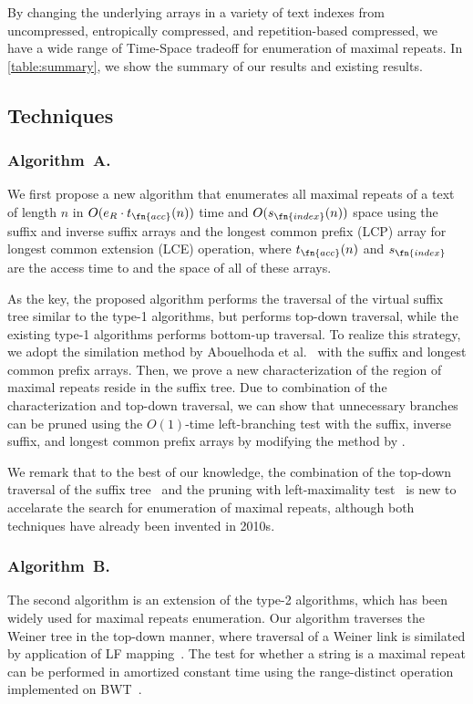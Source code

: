 By changing the underlying arrays in a variety of text indexes from uncompressed, entropically compressed, and repetition-based compressed, we have a wide range of Time-Space tradeoff for enumeration of maximal repeats. 
In \cref{table:summary}, we show the summary of our results and existing results. 

\subsection{Techniques}
\subsubsection{Algorithm~A.}
We first propose a new algorithm that enumerates all maximal repeats of a text of length $n$ in $O(e_R\cdot t_\fn{acc}(n))$ time and $O(s_\fn{index}(n))$ space using the suffix and inverse suffix arrays and the longest common prefix (LCP) array for longest common extension (LCE) operation, where $t_\fn{acc}(n)$ and $s_\fn{index}$ are the access time to and the space of all of these arrays. 

As the key, the proposed algorithm performs the traversal of the virtual suffix tree similar to the type-1 algorithms, but performs top-down traversal,  while the existing type-1 algorithms performs bottom-up traversal. To realize this strategy, we adopt the similation method by Abouelhoda et al.~\cite{abouelhoda2004replacing} with the suffix and longest common prefix arrays. 
Then, we prove a new characterization of the region of maximal repeats reside in the suffix tree. 
Due to combination of the characterization and top-down traversal, we can show that unnecessary branches can be pruned using the $O(1)$-time left-branching test with the suffix, inverse suffix, and longest common prefix arrays by modifying the method by \cite{narisawa2007efficient}. 

We remark that to the best of our knowledge, the combination of the top-down traversal of the suffix tree~\cite{abouelhoda2004replacing} and the pruning with left-maximality test~\cite{narisawa2007efficient} is new to accelarate the search for enumeration of maximal repeats, although both techniques have already been invented in 2010s.  

\subsubsection{Algorithm~B.}
The second algorithm is an extension of the type-2 algorithms, which has been widely used for maximal repeats enumeration. Our algorithm traverses the Weiner tree in the top-down manner, where traversal of a Weiner link is similated by application of LF mapping~\cite{Ferragina05:FM}. The test for whether a string is a maximal repeat can be performed in amortized constant time using the range-distinct operation implemented on BWT~\cite{muthukrishnan2002efficient}.

